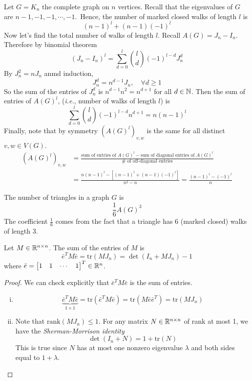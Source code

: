 \begin{example}
Let \(G=K_n\) the complete graph on \(n\) vertices.
Recall that the eigenvalues of \(G\) are \(n-1,-1,-1,\cdots,-1\).\
Hence, the number of marked closed walks of length \(l\) is
\[ (n-1)^{l}+(n-1)(-1)^l \]
Now let's find the total number of walks of length \(l\).
Recall \(A(G)=J_n-I_n\).
Therefore by binomial theorem
\[ (J_n-I_n)^l=\sum_{d=0}^{l}\binom{l}{d}(-1)^{l-d}J_n^d \]
By \(J_n^2=nJ_n\) anmd induction,
\[ J_n^d=n^{d-1}J_n, \quad \forall d\geq1 \]
So the sum of the entries of \(J_n^d\) is \(n^{d-1}n^2=n^{d+1}\) for all \(d\in\mathbb{N}\).
Then the sum of entries of \(A(G)^l\), (\textit{i.e.}, number of walks of length \(l\)) is
\[ \sum_{d=0}^l\binom{l}{d} (-1)^{l-d}{n}^{d+1}=n(n-1)^l \]
Finally, note that by symmetry \(\left(A(G)^l\right)_{v,w}\) is the same for all distinct \(v,w\in V(G)\).
\begin{align*}
\left(A(G)^l\right)_{v,w}&=\frac{\text{sum of entries of }A(G)^l-\text{sum of diagonal entries of }A(G)^l}{\# \text{ of off-diagonal entries}}\\
&=\frac{n(n-1)^l-\left[(n-1)^l+(n-1)(-1)^l\right]}{n^2-n}
=\frac{(n-1)^l-(-1)^l}{n}
\end{align*}
\end{example}

\begin{corollary}
The number of triangles in a graph \(G\) is
\[ \frac{1}{6}A(G)^3 \]
The coefficient \(\frac{1}{6}\) comes from the fact that a triangle has 6 (marked closed) walks of length 3.
\end{corollary}

\begin{lemma}
Let \(M\in\mathbb{R}^{n\times n}\). The sum of the entries of \(M\) is
\[ \bar{e}^T M \bar{e}=\mathrm{tr}(MJ_n)=\det(I_n+MJ_n)-1 \]
where \(\bar e=\begin{bmatrix} 1 & 1 & \cdots & 1 \end{bmatrix}^T\in\mathbb{R}^n \).
\end{lemma}
\begin{proof}
We can check explicitly that \(\bar{e}^TM\bar{e}\) is the sum of entries.
\begin{enumerate}[(i)]
\item \[ \underbrace{\bar{e}^TM\bar{e}}_{1\times1}=\mathrm{tr}\left(\bar{e}^TM\bar{e} \right)=\mathrm{tr}\left(M\bar{e}\bar{e}^T \right)=\mathrm{tr}(MJ_n) \]
\item Note that \(\mathrm{rank}(MJ_n)\leq1\).
For any matrix \(N\in\mathbb{R}^{n\times n}\) of rank at most 1, we have the \emph{Sherman-Morrison identity}
\[ \det(I_n+N)=1+\mathrm{tr}(N) \]
This is true since \(N\) has at most one nonzero eigenvalue \(\lambda\) and both sides equal to \(1+\lambda\).
\end{enumerate}
\end{proof}

